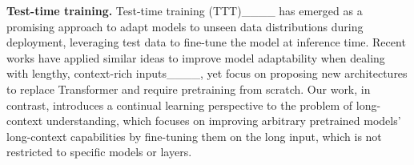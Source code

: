 \textbf{Test-time training. } Test-time training (TTT)____ has emerged as a promising approach to adapt models to unseen data distributions during deployment, leveraging test data to fine-tune the model at inference time. Recent works have applied similar ideas to improve model adaptability when dealing with lengthy, context-rich inputs____, yet focus on proposing new architectures to replace Transformer and require pretraining from scratch. Our work, in contrast, introduces a continual learning perspective to the problem of long-context understanding, which focuses on improving arbitrary pretrained models' long-context capabilities by fine-tuning them on the long input, which is not restricted to specific models or layers. %



